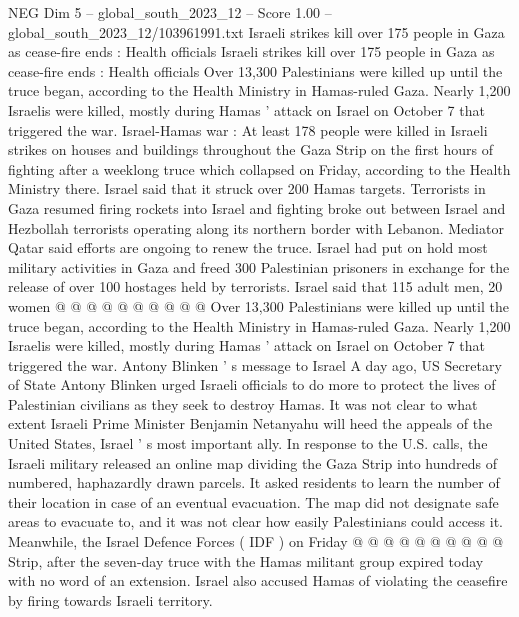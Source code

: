 \begin{textsample}{NEG Dim 5 – global\_south\_2023\_12 – Score 1.00 – global\_south\_2023\_12/103961991.txt}  \label{ex:f5_neg_356}
Israeli strikes kill over 175 people in Gaza as cease-fire ends : Health officials Israeli strikes kill over 175 people in Gaza as cease-fire ends : Health officials Over 13,300 Palestinians were killed up until the truce began, according to the Health Ministry in Hamas-ruled Gaza.
Nearly 1,200 Israelis were killed, mostly during Hamas ' attack on Israel on October 7 that triggered the war.
Israel-Hamas war : At least 178 people were killed in Israeli strikes on houses and buildings throughout the Gaza Strip on the first hours of fighting after a weeklong truce which collapsed on Friday, according to the Health Ministry there.
Israel said that it struck over 200 Hamas targets.
Terrorists in Gaza resumed firing rockets into Israel and fighting broke out between Israel and Hezbollah terrorists operating along its northern border with Lebanon.
Mediator Qatar said efforts are ongoing to renew the truce.
Israel had put on hold most military activities in Gaza and freed 300 Palestinian prisoners in exchange for the release of over 100 hostages held by terrorists.
Israel said that 115 adult men, 20 women @ @ @ @ @ @ @ @ @ @ Over 13,300 Palestinians were killed up until the truce began, according to the Health Ministry in Hamas-ruled Gaza.
Nearly 1,200 Israelis were killed, mostly during Hamas ' attack on Israel on October 7 that triggered the war.
Antony Blinken ' s message to Israel A day ago, US Secretary of State Antony Blinken urged Israeli officials to do more to protect the lives of Palestinian civilians as they seek to destroy Hamas.
It was not clear to what extent Israeli Prime Minister Benjamin Netanyahu will heed the appeals of the United States, Israel ' s most important ally.
In response to the U.S. calls, the Israeli military released an online map dividing the Gaza Strip into hundreds of numbered, haphazardly drawn parcels.
It asked residents to learn the number of their location in case of an eventual evacuation.
The map did not designate safe areas to evacuate to, and it was not clear how easily Palestinians could access it.
Meanwhile, the Israel Defence Forces ( IDF ) on Friday @ @ @ @ @ @ @ @ @ @ Strip, after the seven-day truce with the Hamas militant group expired today with no word of an extension.
Israel also accused Hamas of violating the ceasefire by firing towards Israeli territory.

\end{textsample}
